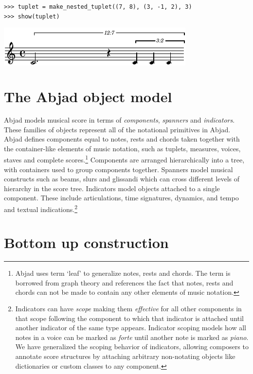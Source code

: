 \documentclass{article}
\begin{document}
\begin{lstlisting}
>>> tuplet = make_nested_tuplet((7, 8), (3, -1, 2), 3)
>>> show(tuplet)
\end{lstlisting}
\includegraphics{assets/lilypond-4926e77647583925d3a89653f8577025.pdf}

\section{The Abjad object model}

Abjad models musical score in terms of \emph{components}, \emph{spanners} and
\emph{indicators}. These families of objects represent all of the notational
primitives in Abjad. Abjad defines components equal to notes, rests and chords
taken together with the container-like elements of music notation, such as
tuplets, measures, voices, staves and complete scores.\footnote{Abjad uses term
`leaf' to generalize notes, rests and chords. The term is borrowed from graph
theory and references the fact that notes, rests and chords can not be made to
contain any other elements of music notation.} Components are arranged
hierarchically into a tree, with containers used to group components
together. Spanners model musical constructs such as beams, slurs
and glissandi which can cross different levels of hierarchy in the score tree.
Indicators model objects attached to a single component. These include
articulations, time signatures, dynamics, and tempo and textual
indications.\footnote{Indicators can have \emph{scope} making them
\emph{effective} for all other components in that scope following the component
to which that indicator is attached until another indicator of the same type
appears. Indicator scoping models how all notes in a voice can be marked as
\emph{forte} until another note is marked as \emph{piano}. We have generalized
the scoping behavior of indicators, allowing composers to annotate score
structures by attaching arbitrary non-notating objects like dictionaries or
custom classes to any component.}

\section{Bottom up construction} \label{sec:bottom-up}
\end{document}

